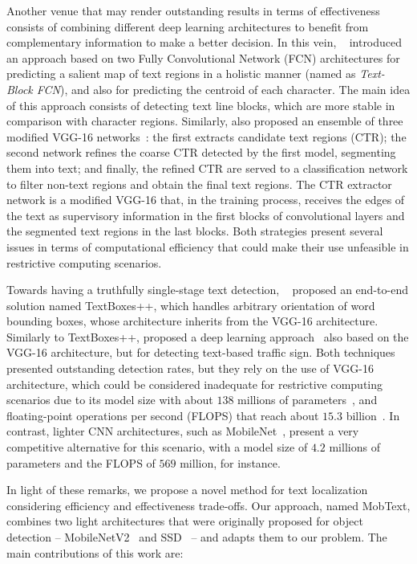 Another venue that may render outstanding results in terms of effectiveness consists of combining different deep learning architectures to benefit from complementary information to make a better decision. In this vein, ~\cite{Zhang2016CVPR} introduced an approach based on two Fully Convolutional Network (FCN) architectures for predicting a salient map of text regions in a holistic manner (named as \textit{Text-Block FCN}), and also for predicting the centroid of each character. The main idea of this approach consists of detecting text line blocks, which are more stable in comparison with character regions. Similarly,  also proposed an ensemble of three modified VGG-16 networks~\cite{Tang2017TIP}: the first extracts candidate text regions (CTR); %
the second network refines the coarse CTR detected by the first model, segmenting them into text; and finally, the refined CTR are served to a classification network to filter non-text regions and obtain the final text regions. The CTR extractor network is a modified VGG-16 that, in the training process, receives the edges of the text as supervisory information in the first blocks of convolutional layers and the segmented text regions in the last blocks. %
Both strategies present several issues in terms of computational efficiency that could make their use unfeasible in restrictive computing scenarios.%

Towards having a truthfully single-stage text detection, ~\cite{Liao2018TIP} proposed an end-to-end solution named TextBoxes++, which handles arbitrary orientation of word bounding boxes, whose architecture inherits from the VGG-16 architecture. Similarly to TextBoxes++,  proposed a deep learning approach~\cite{Zhu2018TITS} also based on the VGG-16 architecture, but for detecting text-based traffic sign. Both techniques presented outstanding detection rates, but they rely on the use of VGG-16 architecture, which could be considered inadequate for restrictive computing scenarios due to its model size with about $138$ millions of parameters~\cite{Howard2017CoRR}, and floating-point operations per second (FLOPS) that reach about $15.3$ billion~\cite{HeCVPR2016}. In contrast, lighter CNN architectures, such as MobileNet~\cite{Howard2017CoRR}, present a very competitive alternative for this scenario, with a model size of $4.2$ millions of parameters and the FLOPS of $569$ million, for instance.

In light of these remarks, we propose a novel method for text localization considering efficiency and effectiveness trade-offs. Our approach, named MobText, combines two light architectures that were originally proposed for object detection -- MobileNetV2~\cite{Sandler2018CVPR} and SSD~\cite{Liu2016ECCV} -- and adapts them to our problem. The main contributions of this work are: 

